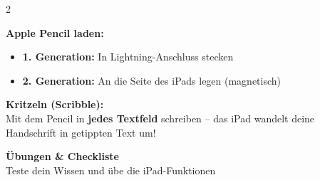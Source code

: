 \documentclass[a4paper,landscape,8pt]{extarticle}
\begin{document}
\begin{multicols}{2}
\vspace{2mm}

\textbf{Apple Pencil laden:}
\begin{itemize}
\item \textbf{1. Generation:} In Lightning-Anschluss stecken
\item \textbf{2. Generation:} An die Seite des iPads legen (magnetisch)
\end{itemize}

\vspace{2mm}

\textbf{Kritzeln (Scribble):}\\
Mit dem Pencil in \textbf{jedes Textfeld} schreiben -- das iPad wandelt deine Handschrift in getippten Text um!

\vspace{3mm}

\begin{center}
\end{center}

\vspace{3mm}

\begin{center}
\end{center}

\end{multicols}

\newpage


\begin{center}
{\LARGE\bfseries Übungen \& Checkliste}\\[3pt]
{\normalsize Teste dein Wissen und übe die iPad-Funktionen}
\end{center}
\end{document}
